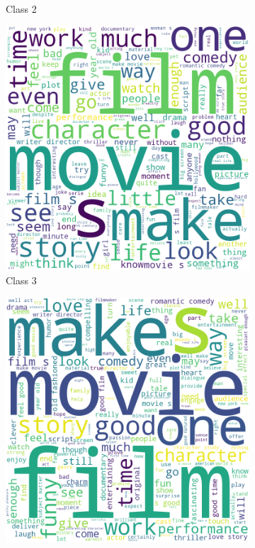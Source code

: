 \documentclass[10pt, a4paper]{article}
\begin{document}
\begin{figure}[h]
\begin{subfigure}[b]{0.18\textwidth}
         \caption{Class 2}
         \label{fig:lemma2cloud}
     \end{subfigure}
     \hfill
     \begin{subfigure}[b]{0.18\textwidth}
         \centering
         \includegraphics[width=\textwidth]{lemma3.png}
         \caption{Class 3}
         \label{fig:lemma3cloud}
     \end{subfigure}
     \hfill
     \begin{subfigure}[b]{0.18\textwidth}
         \centering
         \includegraphics[width=\textwidth]{lemma4.png}

\end{subfigure}
\end{figure}
\end{document}
